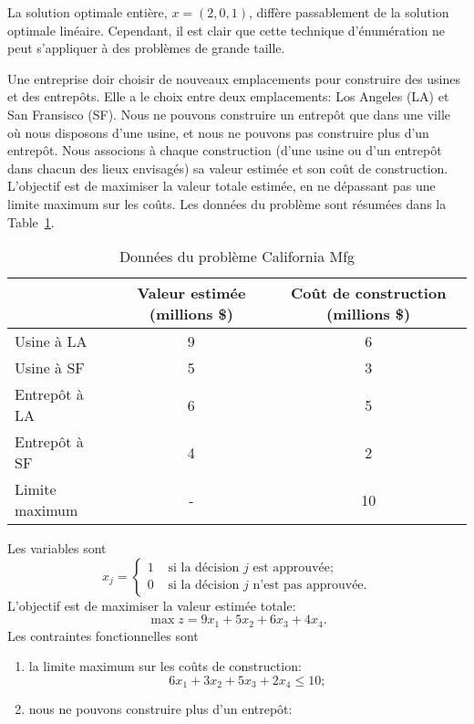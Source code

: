 \begin{example}
La solution optimale entière, $x = (2, 0, 1)$, diffère passablement de la solution optimale linéaire.
Cependant, il est clair que cette technique d'énumération ne peut s'appliquer à des problèmes de grande taille.
\end{example}

\begin{example}
Une entreprise doir choisir de nouveaux emplacements pour construire des usines et
des entrepôts.
Elle a le choix entre deux emplacements: Los Angeles (LA) et San Fransisco (SF).
Nous ne pouvons construire un entrepôt que dans une ville où nous disposons d'une usine, et nous ne pouvons pas construire plus d'un entrepôt.
Nous associons à chaque construction (d'une usine ou d'un entrepôt dans chacun des lieux envisagés) sa valeur estimée et son coût de construction.
L'objectif est de maximiser la valeur totale estimée, en ne dépassant pas une limite maximum sur les coûts.
Les données du problème sont résumées dans la Table~\ref{tab:california}.
\begin{table}
\begin{center}
\begin{tabular}{|l|c|c|}
\hline
& Valeur estimée (millions \$) & Coût de construction (millions \$) \\
\hline
Usine à LA & 9 & 6 \\
\hline
Usine à SF & 5 & 3 \\
\hline
Entrepôt à LA & 6 & 5 \\
\hline
Entrepôt à SF & 4 & 2 \\
\hline
Limite maximum & - & 10 \\
\hline
\end{tabular}
\caption{Données du problème California Mfg}
\label{tab:california}
\end{center}
\end{table}
Les variables sont
\[
x_j =
\begin{cases}
1 & \mbox{ si la décision $j$ est approuvée;} \\
0 & \mbox{ si la décision $j$ n'est pas approuvée.}
\end{cases}
\]
L'objectif est de maximiser la valeur estimée totale:
\[
\max z = 9x_1 + 5x_2 + 6x_3 + 4x_4.
\]
Les contraintes fonctionnelles sont
\begin{enumerate}
\item
la limite maximum sur les coûts de construction:
\[
6x_1 + 3x_2 + 5x_3 + 2x_4 \leq 10;
\]
\item
nous ne pouvons construire plus d'un entrepôt:

\end{enumerate}
\end{example}
